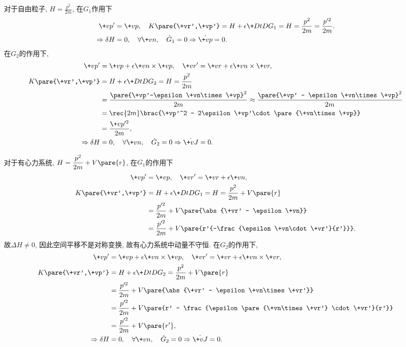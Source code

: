 \documentclass{ctexart}
\begin{document}
\begin{sample}
    \begin{ex}
        对于自由粒子, $\displaystyle H = \frac{p^2}{2m}$, 在$G_1$作用下
        \begin{align*}
            \+vp' &= \+vp,\quad K\pare{\+vr',\+vp'} = H + \epsilon \+DtD{G_1} = H = \frac{p^2}{2m} = \frac{p'^2}{2m}. \\
            \Rightarrow \delta H &= 0,\quad \forall \+vn,\quad \dot{G}_1 = 0 
            \Rightarrow \dot{\+vp} = 0.
        \end{align*}
        在$G_2$的作用下,
        \begin{align*}
            \+vp' &= \+vp + \epsilon \+vn\times\+vp,\quad \+vr' = \+vr + \epsilon\+vn\times\+vr, \\
            K\pare{\+vr',\+vp'} &= H + \epsilon\+DtD{G_2} = H = \frac{p^2}{2m} \\
            &= \frac{\pare{\+vp'-\epsilon\+vn\times\+vp}^2}{2m} \approx \frac{\pare{\+vp' - \epsilon\+vn\times\+vp}^2}{2m} \\
            &= \rec{2m} \brac{\+vp'^2 - 2\epsilon \+vp'\cdot\pare{\+vn\times \+vp}} \\
            &= \frac{\+vp'^2}{2m}, \\
            \Rightarrow \delta H &= 0,\quad \forall \+vn,\quad \dot{G}_2 = 0 \Rightarrow \dot{\+vJ} = 0.
        \end{align*}
    \end{ex}
\end{sample}
\begin{sample}
    \begin{ex}
        对于有心力系统, $\displaystyle H = \frac{p^2}{2m} + V\pare{r}$, 在$G_1$的作用下
        \begin{align*}
            \+vp' &= \+vp,\quad \+vr' = \+vr + \epsilon\+vn, \\
            K\pare{\+vr',\+vp'} &= H + \epsilon \+DtD{G_1} = H = \frac{p^2}{2m} + V\pare{r} \\
            &= \frac{p'^2}{2m} + V\pare{\abs{\+vr' - \epsilon \+vn}} \\
            &= \frac{p'^2}{2m} + V\pare{r'{-\frac{\epsilon\+vn\cdot \+vr'}{r'}}}.
        \end{align*}
        故$\Delta H \neq 0$, 因此空间平移不是对称变换, 故有心力系统中动量不守恒. 在$G_2$的作用下,
        \begin{align*}
            \+vp' &= \+vp + \epsilon \+vn\times\+vp,\quad \+vr' = \+vr + \epsilon\+vn\times\+vr, \\
            K\pare{\+vr',\+vp'} &= H + \epsilon \+DtD{G_2} = \frac{p^2}{2m} + V\pare{r} \\
            &= \frac{p'^2}{2m} + V\pare{\abs{\+vr' - \epsilon \+vn\times \+vr'}} \\
            &= \frac{p'^2}{2m} + V\pare{r' - \frac{\epsilon \pare{\+vn\times \+vr'} \cdot \+vr'}{r'}} \\
            &= \frac{p'^2}{2m} + V\pare{r'}, \\
            \Rightarrow \delta H &= 0,\quad \forall \+vn,\quad \dot{G}_2 = 0\Rightarrow \dot{\+vJ} = 0.
        \end{align*}
    \end{ex}
\end{sample}
\end{document}
